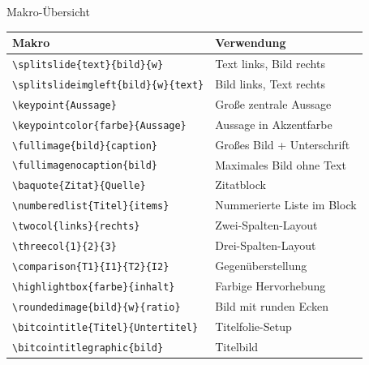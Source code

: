 \documentclass[aspectratio=169,t,9pt]{beamer}
\begin{document}
\begin{frame}{Makro-Übersicht}

	\vspace{0.3em}
	{\fontsize{8}{11}\selectfont
		\begin{tabular}{@{}l l@{}}
			\toprule
			\textbf{Makro} & \textbf{Verwendung} \\
			\midrule
			\texttt{\textbackslash splitslide\{text\}\{bild\}\{w\}}           & Text links, Bild rechts \\
			\texttt{\textbackslash splitslideimgleft\{bild\}\{w\}\{text\}}    & Bild links, Text rechts \\
			\texttt{\textbackslash keypoint\{Aussage\}}                        & Große zentrale Aussage \\
			\texttt{\textbackslash keypointcolor\{farbe\}\{Aussage\}}          & Aussage in Akzentfarbe \\
			\texttt{\textbackslash fullimage\{bild\}\{caption\}}               & Großes Bild + Unterschrift \\
			\texttt{\textbackslash fullimagenocaption\{bild\}}                 & Maximales Bild ohne Text \\
			\texttt{\textbackslash baquote\{Zitat\}\{Quelle\}}                & Zitatblock \\
			\texttt{\textbackslash numberedlist\{Titel\}\{items\}}             & Nummerierte Liste im Block \\
			\texttt{\textbackslash twocol\{links\}\{rechts\}}                  & Zwei-Spalten-Layout \\
			\texttt{\textbackslash threecol\{1\}\{2\}\{3\}}                    & Drei-Spalten-Layout \\
			\texttt{\textbackslash comparison\{T1\}\{I1\}\{T2\}\{I2\}}        & Gegenüberstellung \\
			\texttt{\textbackslash highlightbox\{farbe\}\{inhalt\}}            & Farbige Hervorhebung \\
			\texttt{\textbackslash roundedimage\{bild\}\{w\}\{ratio\}}         & Bild mit runden Ecken \\
			\texttt{\textbackslash bitcointitle\{Titel\}\{Untertitel\}}        & Titelfolie-Setup \\
			\texttt{\textbackslash bitcointitlegraphic\{bild\}}                & Titelbild \\
			\bottomrule
		\end{tabular}
	}

\end{frame}
\end{document}
